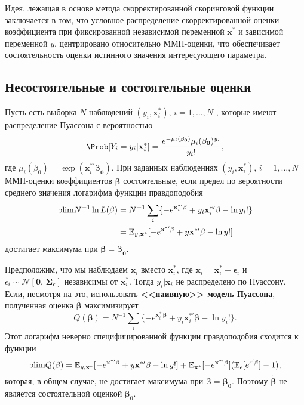 Идея, лежащая в основе метода скорректированной скоринговой функции заключается в том, что условное распределение скорректированной оценки коэффициента при фиксированной независимой переменной $\mathbf{x^*}$ и зависимой переменной $y$, центрировано относительно ММП-оценки, что обеспечивает состоятельность оценки истинного значения интересующего параметра.

\subsection*{Несостоятельные и состоятельные оценки} 
Пусть есть выборка $N$ наблюдений $(y_i, \mathbf{x}^*_i), \, i=1, \dots,N$ , которые имеют распределение Пуассона с вероятностью
\[
\Prob[Y_i=y_i|\mathbf{x}^*_i]=\frac{e^{-\mu_i(\mathbf{\beta_0})}\mu_i(\mathbf{\beta_0})^{y_i}}{y_i!},
\]
где $\mu_i(\beta_0)=\exp(\mathbf{x}^{*\prime}_i \mathbf{\beta_0})$. При заданных наблюдениях $(y_i, \mathbf{x}^*_i), \, i=1, \dots, N$ ММП-оценки коэффициентов $\mathbf{\widehat{\beta}}$ состоятельные, если предел по вероятности среднего значения логарифма функции правдоподобия
\begin{align}
\mathrm{plim } N^{-1}\ln L(\mathbf{\beta})&=N^{-1} \sum \limits_i \{ -e^{\mathbf{x}^{*\prime}_i \mathbf{\beta}} + y_i \mathbf{x}^{*\prime}_i \mathbf{\beta} - \ln y_i! \} \notag \\
&= \mathbb{E}_{y,\mathbf{x^*}}[-e^{\mathbf{x^{*\prime}} \mathbf{\beta}} + y \mathbf{x^{*\prime}} \mathbf{\beta} - \ln y! ]
\end{align}
достигает максимума при $\mathbf{\beta} = \mathbf{\beta_0}$.

Предположим, что мы наблюдаем $\mathbf{x}_i$ вместо $\mathbf{x}^*_i$, где $\mathbf{x}_i=\mathbf{x}^*_i+\mathbf{\epsilon}_i$ и $\epsilon_i \sim \mathcal{N}[\mathbf{0}, \, \mathbf{\Sigma_{\epsilon}}]$ независимы от $\mathbf{x}^*_i$. Тогда $y_i| \mathbf{x}_i$ не распределено по Пуассону. Если, несмотря на это, использовать {\bf  <<наивную>> модель Пуассона}, полученная оценка $\mathbf{\tilde{\beta}}$ максимизирует
\begin{equation}
Q(\mathbf{\beta})= N^{-1} \sum \limits_i \{ -e^{\mathbf{x}^{*\prime}_i \mathbf{\beta}} + y_i \mathbf{x}^{*\prime}_i \mathbf{\beta} - \ln y_i! \}.
\end{equation}
Этот логарифм неверно специфицированной функции правдоподобия сходится к функции
\begin{equation}
\mathrm{plim } Q(\mathbf{\beta})=\mathbb{E}_{y,\mathbf{x}^*}[-e^{\mathbf{x}^{*\prime} \mathbf{\beta}} + y \mathbf{x^{*\prime}} \mathbf{\beta} - \ln y! ] +  \mathbb{E}_{\mathbf{x^*}} [-e^{\mathbf{x^{*\prime}} \mathbf{\beta}}] (\mathbb{E}_{\epsilon}[e^{\mathbf{\epsilon}' \mathbf{\beta}}]-1),
\end{equation}
которая, в общем случае, не достигает максимума при $\mathbf{\beta}= \mathbf{\beta_0}$. Поэтому $\mathbf{\tilde{\beta}}$ не является состоятельной оценкой $\mathbf{\beta}_0$.

